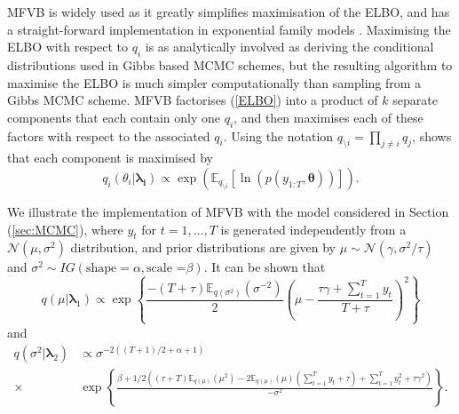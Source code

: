 \documentclass[12pt,a4paper]{article}%
\numberwithin{equation}{section}
\begin{document}
MFVB is widely used as it greatly simplifies maximisation of the ELBO, and has a straight-forward implementation in exponential family models \citep{Wainwright2008}.  Maximising the ELBO with respect to $q_i$ is as analytically involved as deriving the conditional distributions used in Gibbs based MCMC schemes, but the resulting algorithm to maximise the ELBO is much simpler computationally than sampling from a Gibbs MCMC scheme. MFVB factorises (\ref{ELBO}) into a product of $k$ separate components that each contain only one $q_i$, and then maximises each of these factors with respect to the associated $q_i$. Using the notation $q_{\setminus i} = \prod_{j\neq i}q_j$, \citet{Attias1999} shows that each component is maximised by
\begin{equation}
\label{mf2}
q_i(\theta_i |\boldsymbol{\lambda_i}) \propto\exp( \mathbb{E}_{q_{\setminus i}} [\ln(p(y_{1:T},\boldsymbol{\theta}))]).
\end{equation}

We illustrate the implementation of MFVB with the model considered in Section (\ref{sec:MCMC}), where $y_t$ for $t = 1, \dots, T$ is generated independently from a $\mathcal{N}(\mu, \sigma^2)$ distribution, and prior distributions are given by $\mu \sim \mathcal{N}(\gamma, \sigma^2 / \tau)$ and $\sigma^2 \sim IG(\mbox{shape} = \alpha, \mbox{scale =}\beta)$. It can be shown that
\begin{equation}
\label{mf3}
q(\mu | \boldsymbol{\lambda}_1) \propto \exp \left\{ \frac{-(T + \tau) \mathbb{E}_{q(\sigma^2)}(\sigma^{-2})}{2} \left( \mu - \frac{\tau \gamma + \sum_{t=1}^{T} y_t}{T + \tau} \right)^2 \right\}
\end{equation}
and
\begin{align}
\label{mf4}
q(\sigma^2 | \boldsymbol{\lambda}_2) &\propto \sigma^{-2((T+1)/2 + \alpha + 1)} \nonumber \\
\times &\exp \left\{ \frac{ \beta + 1/2\left((\tau + T)\mathbb{E}_{q(\mu)}(\mu^2) - 2 \mathbb{E}_{q(\mu)}(\mu)(\sum_{t=1}^{T}y_t + \tau) + \sum_{t=1}^{T} y_t^2 + \tau \gamma^2\right)}{-\sigma^2} \right\}.
\end{align}
\end{document}

